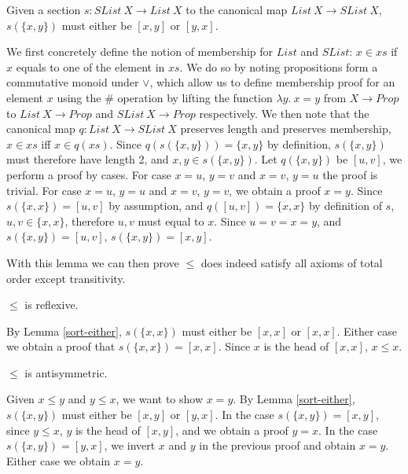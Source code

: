 \documentclass{article}
\begin{document}
\begin{mylemma}
    \label{sort-either}
    Given a section $s : SList \: X \rightarrow List \: X$ to the canonical map $List \: X \rightarrow SList \: X$,
    $s(\{x, y\})$ must either be $[x, y]$ or $[y, x]$.
\end{mylemma}

We first concretely define the notion of membership for $List$ and $SList$: $x \in xs$ if $x$ equals to one of the element in $xs$.
We do so by noting propositions form a commutative monoid under $\vee$,
which allow us to define membership proof for an element $x$ using the $\#$ operation
by lifting the function $\lambda y. \: x = y$ from $X \rightarrow Prop$ to $List \: X \rightarrow Prop$ and $SList \: X \rightarrow Prop$ respectively.
We then note that the canonical map $q : List \: X \rightarrow SList \: X$ preserves length and preserves membership, $x \in xs$ iff $x \in q(xs)$.
Since $q(s(\{x, y\})) = \{x, y\}$ by definition, $s(\{x,y\})$ must therefore have length 2, and $x, y \in s(\{x, y\})$.
Let $q(\{x, y\})$ be $[u, v]$, we perform a proof by cases. For case $x = u$, $y = v$ and $x = v$, $y = u$ the proof is trivial.
For case $x = u$, $y = u$ and $x = v$, $y = v$, we obtain a proof $x = y$. Since $s(\{x, x\}) = [u , v]$ by assumption,
and $q([u, v]) = \{x, x\}$ by definition of $s$, $u, v \in \{x, x\}$, therefore $u, v$ must equal to $x$.
Since $u = v = x = y$, and $s(\{x, y\}) = [u, v]$, $s(\{x, y\}) = [x, y]$.

With this lemma we can then prove $\leq$ does indeed satisfy all axioms of total order except transitivity.

\begin{mythm}
    $\leq$ is reflexive.
\end{mythm}
    By Lemma \ref{sort-either}, $s(\{x, x\})$ must either be $[x, x]$ or $[x ,x]$. Either case we obtain a proof that
    $s(\{x, x\}) = [x, x]$. Since $x$ is the head of $[x, x]$, $x \leq x$.

\begin{mythm}
    $\leq$ is antisymmetric.
\end{mythm}
    Given $x \leq y$ and $y \leq x$, we want to show $x = y$.
    By Lemma \ref{sort-either}, $s(\{x, y\})$ must either be $[x, y]$ or $[y, x]$. In the case $s(\{x, y\}) = [x, y]$,
    since $y \leq x$, $y$ is the head of $[x, y]$, and we obtain a proof $y = x$. In the case $s(\{x, y\}) = [y, x]$,
    we invert $x$ and $y$ in the previous proof and obtain $x = y$. Either case we obtain $x = y$.
\end{document}
